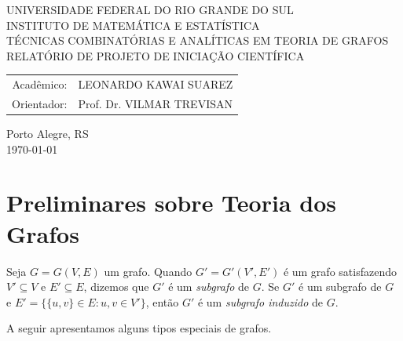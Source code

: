 \documentclass{article}
\begin{document}
\begin{center}
    \large UNIVERSIDADE FEDERAL DO RIO GRANDE DO SUL \\
    \large INSTITUTO DE MATEMÁTICA E ESTATÍSTICA \\
    \vspace{4cm}
    \huge TÉCNICAS COMBINATÓRIAS E ANALÍTICAS EM TEORIA DE GRAFOS \\
    \vspace{1cm}
    \Large RELATÓRIO DE PROJETO DE INICIAÇÃO CIENTÍFICA \\
    \vspace{4cm}

    \large\begin{tabular}{rl}
        Acadêmico: & LEONARDO KAWAI SUAREZ \\
        Orientador: & Prof. Dr. VILMAR TREVISAN \\
    \end{tabular}

    \vfill
    \large Porto Alegre, RS \\
    \large \today
\end{center}

\newpage
\tableofcontents

\section{Preliminares sobre Teoria dos Grafos}

\begin{defn}
    Seja \(G=G(V,E)\) um grafo. Quando \(G'=G'(V',E')\) é um grafo satisfazendo \(V' \subseteq V\) e \(E' \subseteq E\), dizemos que \(G'\) é um \emph{subgrafo} de \(G\). Se \(G'\) é um subgrafo de \(G\) e \(E' = \{\{u,v\} \in E : u,v \in V'\}\), então \(G'\) é um \emph{subgrafo induzido} de \(G\).
\end{defn}

A seguir apresentamos alguns tipos especiais de grafos.
\end{document}
